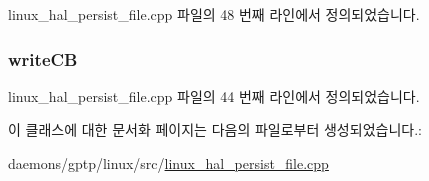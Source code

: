linux\+\_\+hal\+\_\+persist\+\_\+file.\+cpp 파일의 48 번째 라인에서 정의되었습니다.

\subsubsection[{\texorpdfstring{write\+CB}{writeCB}}]{ write\+CB\hspace{0.3cm}{\ttfamily [private]}}\hypertarget{class_linux_g_p_t_p_persist_file_a914beb5a5d0085ceeea5f3f9f3143020}{}\label{class_linux_g_p_t_p_persist_file_a914beb5a5d0085ceeea5f3f9f3143020}


linux\+\_\+hal\+\_\+persist\+\_\+file.\+cpp 파일의 44 번째 라인에서 정의되었습니다.



이 클래스에 대한 문서화 페이지는 다음의 파일로부터 생성되었습니다.\+:\begin{DoxyCompactItemize}
\item 
daemons/gptp/linux/src/\hyperlink{linux__hal__persist__file_8cpp}{linux\+\_\+hal\+\_\+persist\+\_\+file.\+cpp}\end{DoxyCompactItemize}
